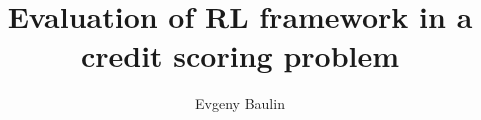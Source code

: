 \usepackage[T1,T2A]{fontenc}
\usepackage[utf8]{inputenc}
\usepackage[russian, english]{babel}

\usepackage{amsmath, amssymb, amsthm, mathtools}


\theoremstyle{plain}
\newtheorem{theorem}{Теорема}[section]
\newtheorem{lemma}[theorem]{Лемма}
\newtheorem{proposition}[theorem]{Утверждение}
\theoremstyle{definition}
\newtheorem{definition}[theorem]{Определение}
\theoremstyle{remark}
\newtheorem{remark}[theorem]{Замечание}

\usepackage[top=1in, bottom=1in, left=0.5in, right=0.5in]{geometry}
\usepackage{microtype}   %
\usepackage{indentfirst} %
\usepackage{setspace}    %

\usepackage{enumitem}    %
\usepackage{booktabs}    %
\usepackage{float}       %
\usepackage{graphicx}    %
\usepackage{subcaption}  %

\usepackage{tocloft}
\renewcommand{\cftsecpagefont}{\bfseries}

\usepackage[unicode=true, colorlinks=true, linkcolor=blue, urlcolor=blue, citecolor=blue]{hyperref}

\title{Evaluation of RL framework in a credit scoring problem}
\author{Evgeny Baulin}
\date{}



\maketitle
\tableofcontents
\clearpage

\section{}




